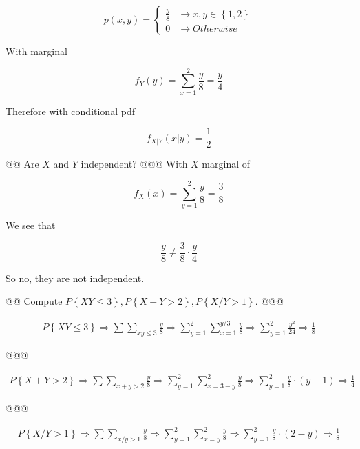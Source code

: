 \documentclass[11pt]{article}\usepackage[]{graphicx}\usepackage[]{xcolor}
\begin{document}
\begin{easylist}[enumerate]
    \[
        p(x, y) =
        \begin{cases}
            \frac{y}{8} &\to x, y \in \left\{ 1, 2 \right\}\\
            0 &\to Otherwise
        \end{cases}
    \]

    With marginal

    \[
        f_Y(y) = \sum_{x = 1}^2 \frac{y}{8} = \frac{y}{4}
    \]

    Therefore with conditional pdf

    \[
        f_{X|Y}\left( x|y \right) = \frac{1}{2}
    \]

    @@ Are $X$ and $Y$ independent?
    @@@ With $X$ marginal of

    \[
        f_X(x) = \sum_{y = 1}^2 \frac{y}{8} = \frac{3}{8}
    \]

    We see that

    \[
        \frac{y}{8} \neq \frac{3}{8} \cdot \frac{y}{4}
    \]

    So no, they are not independent.

    @@ Compute $P\left\{ XY \le 3 \right\}, P\left\{ X + Y > 2 \right\}, P\left\{ X / Y > 1 \right\}$.
    @@@ 

    \[
        \begin{aligned}
            P\left\{ XY \le 3 \right\} \Rightarrow
            \sum \sum\limits_{xy \le 3} \frac{y}{8} \Rightarrow
            \sum_{y = 1}^2 \sum_{x = 1}^{y/3} \frac{y}{8} \Rightarrow
            \sum_{y = 1}^2 \frac{y^2}{24} \Rightarrow \frac{1}{8}
        \end{aligned}
    \]

    @@@ 

    \[
        \begin{aligned}
            P\left\{ X + Y > 2 \right\} \Rightarrow
            \sum \sum\limits_{x + y > 2} \frac{y}{8} \Rightarrow
            \sum_{y = 1}^2 \sum_{x = 3 - y}^2 \frac{y}{8} \Rightarrow
            \sum_{y = 1}^2 \frac{y}{8} \cdot (y - 1) \Rightarrow
            \frac{1}{4}
        \end{aligned}
    \]

    @@@ 

    \[
        \begin{aligned}
            P\left\{ X / Y > 1 \right\} \Rightarrow
            \sum \sum\limits_{x / y > 1} \frac{y}{8} \Rightarrow
            \sum_{y = 1}^2 \sum_{x = y}^2 \frac{y}{8} \Rightarrow
            \sum_{y = 1}^2 \frac{y}{8} \cdot (2 - y) \Rightarrow
            \frac{1}{8}
        \end{aligned}
    \]



\end{easylist}
\end{document}
